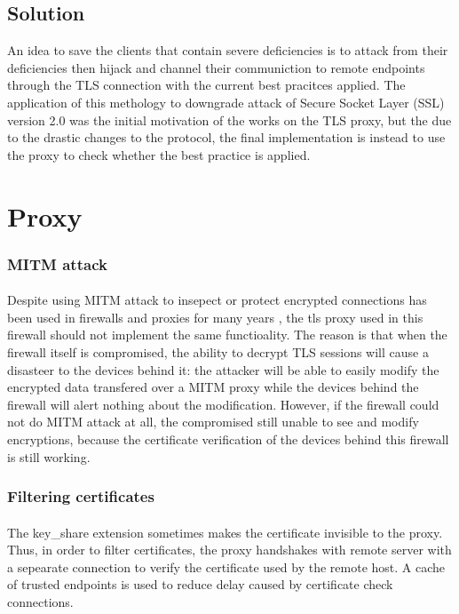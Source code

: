 \documentclass[mscthesis]{usiinfthesis}
\begin{document}
\subsection{Solution}
An idea to save the clients that contain severe deficiencies is to attack from their deficiencies then hijack and channel their communiction to remote endpoints through the TLS connection with the current best pracitces applied. The application of this methology to downgrade attack of Secure Socket Layer (SSL) version 2.0 was the initial motivation of the works on the TLS proxy, but the due to the drastic changes to the protocol, the final implementation is instead to use the proxy to check whether the best practice is applied.


\section{Proxy}
\subsubsection{MITM attack}
\paragraph{}
Despite using MITM attack to insepect or protect encrypted connections has been used in firewalls and proxies for many years \citep{fortigate:deepinspection}, the tls proxy used in this firewall should not implement the same functioality. The reason is that when the firewall itself is compromised, the ability to decrypt TLS sessions will cause a disasteer to the devices behind it: the attacker will be able to easily modify the encrypted data transfered over a MITM proxy while the devices behind the firewall will alert nothing about the modification. However, if the firewall could not do MITM attack at all, the compromised still unable to see and modify encryptions, because the certificate verification of the devices behind this firewall is still working.
\subsubsection{Filtering certificates}
\paragraph{}
The key\_share extension sometimes makes the certificate invisible to the proxy. Thus, in order to filter certificates, the proxy handshakes with remote server with a sepearate connection to verify the certificate used by the remote host. A cache of trusted endpoints is used to reduce delay caused by certificate check connections.
\end{document}
